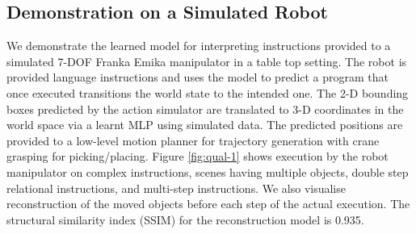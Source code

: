 %
\subsection{Demonstration on a Simulated Robot}
%
We demonstrate the learned model for interpreting instructions 
provided to a simulated 7-DOF Franka Emika manipulator in a table top setting. 
%
The robot is provided language instructions and uses the model to predict a program that once executed transitions the world state to the intended one. The 2-D bounding boxes predicted by the action simulator are translated to 3-D coordinates in the world space via a learnt MLP using simulated data.
%
The predicted positions are provided to a low-level motion planner for trajectory generation with crane grasping for picking/placing. 
% 
Figure \ref{fig:qual-1} shows execution by the robot manipulator on complex instructions, scenes having multiple objects, double step relational instructions, and multi-step instructions. We also visualise reconstruction of the moved objects before each step of the actual execution. The structural similarity index (SSIM) for the reconstruction model is 0.935.
%

